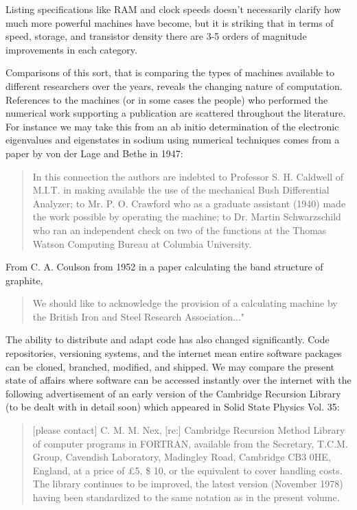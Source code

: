 Listing specifications like RAM and clock speeds doesn't necessarily clarify 
how much more powerful machines have become, 
but it is striking that in terms of speed, storage, and transistor density 
there are 3-5 orders of magnitude improvements in each category. 

Comparisons of this sort, that is comparing the types of machines available to different researchers
over the years, reveals the changing nature of computation. References to the machines (or in some cases
the people) who performed the numerical work supporting a publication are scattered throughout the literature.
For instance we may take this from an ab initio determination of the electronic eigenvalues and eigenstates
in sodium using numerical techniques comes from a paper by von der Lage and Bethe in 1947:
%
\begin{quote}
In this connection the authors are indebted to Professor S. H. Caldwell of M.I.T. in making available the
use of the mechanical Bush Differential Analyzer; to Mr. P. O. Crawford who as a graduate assistant (1940)
made the work possible by operating the machine; to Dr. Martin Schwarzschild who ran an independent
check on two of the functions at the Thomas Watson Computing Bureau at Columbia University.
\end{quote}
%

From C. A. Coulson from 1952 in a paper calculating the band structure of graphite, 
%
\begin{quote}
We should like to acknowledge the provision of a calculating machine by the
British Iron and Steel Research Association..."
\end{quote}

The ability to distribute and adapt code has also changed significantly. 
Code repositories, versioning systems, and the internet mean entire software
packages can be cloned, branched, modified, and shipped. We may compare the
present state of affairs where software can be accessed instantly over the internet
with the following advertisement of an early version
of the Cambridge Recursion Library (to be dealt with in detail soon) which appeared
in Solid State Physics Vol. 35:

\begin{quote}
[please contact] C. M. M. Nex, [re:] Cambridge Recursion Method Library of computer
programs in FORTRAN, available from the Secretary, T.C.M. Group,
Cavendish Laboratory, Madingley Road, Cambridge CB3 0HE, England,
at a price of \pounds 5, \$ 10, or the equivalent to cover handling costs.
The library continues to be improved, the latest version
(November 1978) having been standardized to the same notation
as in the present volume.
\end{quote}

